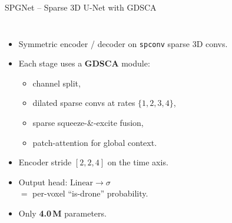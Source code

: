 \documentclass[aspectratio=169,11pt]{beamer}
\begin{document}
\begin{frame}{SPGNet -- Sparse 3D U-Net with GDSCA}
  \vspace{0.2em}
  \begin{columns}[T,onlytextwidth]
    \begin{itemize}
      \setlength\itemsep{0.4em}
      \item Symmetric encoder / decoder on \texttt{spconv} sparse 3D convs.
      \item Each stage uses a \textbf{GDSCA} module:
        \begin{itemize}
          \item channel split,
          \item dilated sparse convs at rates $\{1,2,3,4\}$,
          \item sparse squeeze-\&-excite fusion,
          \item patch-attention for global context.
        \end{itemize}
      \item Encoder stride $[2,2,4]$ on the time axis.
      \item Output head: $\mathrm{Linear}\!\to\!\sigma$\\
            $=$ per-voxel ``is-drone'' probability.
      \item Only \textbf{4.0\,M} parameters.
    \end{itemize}

    \begin{darkbox}
      \centering
    \end{darkbox}
  \end{columns}
\end{frame}
\end{document}
